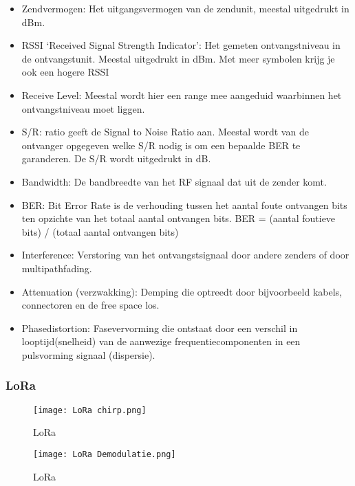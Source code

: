 \begin{itemize}
    \item Zendvermogen: Het uitgangsvermogen van de zendunit, meestal
    uitgedrukt in dBm.
    \item RSSI ‘Received Signal Strength Indicator’: Het gemeten
    ontvangstniveau in de ontvangstunit. Meestal uitgedrukt in dBm.
    Met meer symbolen krijg je ook een hogere RSSI
    \item Receive Level: Meestal wordt hier een range mee aangeduid
    waarbinnen het ontvangstniveau moet liggen.
    \item S/R: ratio geeft de Signal to Noise Ratio aan. Meestal wordt van de
    ontvanger opgegeven welke S/R nodig is om een bepaalde BER te
    garanderen. De S/R wordt uitgedrukt in dB.
    \item Bandwidth: De bandbreedte van het RF signaal dat uit de zender
    komt.
    \item  BER: Bit Error Rate is de verhouding tussen het aantal foute
    ontvangen bits ten opzichte van het totaal aantal ontvangen bits.
    BER = (aantal foutieve bits) / (totaal aantal ontvangen bits)
    \item Interference: Verstoring van het ontvangstsignaal door andere
    zenders of door multipathfading.
    \item Attenuation (verzwakking): Demping die optreedt door bijvoorbeeld
    kabels, connectoren en de free space los.
    \item Phasedistortion: Fasevervorming die ontstaat door een verschil in
    looptijd(snelheid) van de aanwezige frequentiecomponenten in een
    pulsvorming signaal (dispersie).
  \end{itemize}


\subsubsection{LoRa}

\begin{figure}[H]
\centering
\texttt{[image: LoRa chirp.png]}
\caption{LoRa}
\end{figure}

\begin{figure}[H]
\centering
\texttt{[image: LoRa Demodulatie.png]}
\caption{LoRa}
\end{figure}
